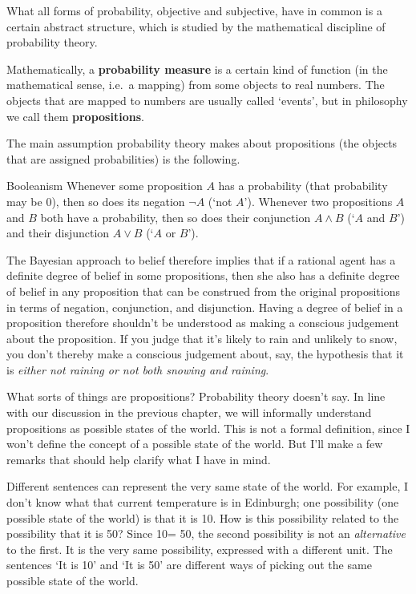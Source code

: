What all forms of probability, objective and subjective, have in
common is a certain abstract structure, which is studied by the
mathematical discipline of probability theory.

Mathematically, a \textbf{probability measure} is a certain kind of
function (in the mathematical sense, i.e.\ a mapping) from some
objects to real numbers. The objects that are mapped to numbers are
usually called `events', but in philosophy we call them
\textbf{propositions}.

The main assumption probability theory makes about propositions
(the objects that are assigned probabilities) is the following.
%
\begin{genericthm}{Booleanism}
  Whenever some proposition $A$ has a probability (that probability may be 0),
  then so does its negation $\neg A$ (`not $A$'). Whenever two propositions $A$
  and $B$ both have a probability, then so does their conjunction $A \land B$
  (`$A$ and $B$') and their disjunction $A \lor B$ (`$A$ or $B$').
\end{genericthm}
%
The Bayesian approach to belief therefore implies that if a rational agent has a
definite degree of belief in some propositions, then she also has a definite
degree of belief in any proposition that can be construed from the original
propositions in terms of negation, conjunction, and disjunction. Having a degree
of belief in a proposition therefore shouldn't be understood as making a
conscious judgement about the proposition. If you judge that it's likely to rain
and unlikely to snow, you don't thereby make a conscious judgement about, say,
the hypothesis that it is \emph{either not raining or not both snowing and
  raining}.

What sorts of things are propositions? Probability theory doesn't say.
In line with our discussion in the previous chapter, we will
informally understand propositions as possible states of the world.
This is not a formal definition, since I won't define the concept
of a possible state of the world. But I'll make a few remarks
that should help clarify what I have in mind.

Different sentences can represent the very same state of the world.
For example, I don't know what that current temperature is in
Edinburgh; one possibility (one possible state of the world) is that
it is 10\celsius. How is this possibility related to the possibility
that it is 50\fahrenheit? Since 10\celsius = 50\fahrenheit, the second
possibility is not an \emph{alternative} to the first. It is the very
same possibility, expressed with a different unit. The sentences `It is
10\celsius' and `It is 50\fahrenheit' are different ways of picking
out the same possible state of the world.

